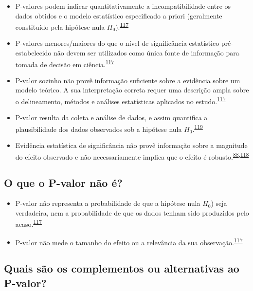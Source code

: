 \documentclass[
  a4paper,
]{book}
\begin{document}
\begin{itemize}
\item
  P-valores podem indicar quantitativamente a incompatibilidade entre os dados obtidos e o modelo estatístico especificado a priori (geralmente constituído pela hipótese nula \(H_{0}\)).\textsuperscript{\protect\hyperlink{ref-wasserstein2016}{117}}
\item
  P-valores menores/maiores do que o nível de significância estatístico pré-estabelecido não devem ser utilizados como única fonte de informação para tomada de decisão em ciência.\textsuperscript{\protect\hyperlink{ref-wasserstein2016}{117}}
\item
  P-valor sozinho não provê informação suficiente sobre a evidência sobre um modelo teórico. A sua interpretação correta requer uma descrição ampla sobre o delineamento, métodos e análises estatísticas aplicados no estudo.\textsuperscript{\protect\hyperlink{ref-wasserstein2016}{117}}
\item
  P-valor resulta da coleta e análise de dados, e assim quantifica a plausibilidade dos dados observados sob a hipótese nula \(H_{0}\).\textsuperscript{\protect\hyperlink{ref-heinze2016}{119}}
\item
  Evidência estatística de significância não provê informação sobre a magnitude do efeito observado e não necessariamente implica que o efeito é robusto.\textsuperscript{\protect\hyperlink{ref-Landis2012}{88},\protect\hyperlink{ref-altman2017}{118}}
\end{itemize}

\hypertarget{o-que-o-p-valor-nuxe3o-uxe9}{%
\subsection{O que o P-valor não é?}\label{o-que-o-p-valor-nuxe3o-uxe9}}

\begin{itemize}
\item
  P-valor não representa a probabilidade de que a hipótese nula \(H_{0}\)) seja verdadeira, nem a probabilidade de que os dados tenham sido produzidos pelo acaso.\textsuperscript{\protect\hyperlink{ref-wasserstein2016}{117}}
\item
  P-valor não mede o tamanho do efeito ou a relevância da sua observação.\textsuperscript{\protect\hyperlink{ref-wasserstein2016}{117}}
\end{itemize}

\hypertarget{quais-suxe3o-os-complementos-ou-alternativas-ao-p-valor}{%
\subsection{Quais são os complementos ou alternativas ao P-valor?}\label{quais-suxe3o-os-complementos-ou-alternativas-ao-p-valor}}
\end{document}
